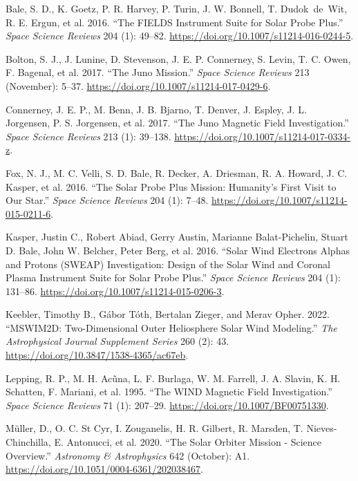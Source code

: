\documentclass[
  letterpaper,
  DIV=11,
  numbers=noendperiod,
  oneside]{scrartcl}
\newlength{\cslhangindent}
\newenvironment{CSLReferences}[2] %
 {\begin{list}{}{%
  \setlength{\itemindent}{0pt}
  \setlength{\leftmargin}{0pt}
  \setlength{\parsep}{0pt}
  \ifodd #1
   \setlength{\leftmargin}{\cslhangindent}
   \setlength{\itemindent}{-1\cslhangindent}
  \fi
  \setlength{\itemsep}{#2\baselineskip}}}
 {\end{list}}
\begin{document}
\label{refs}
\begin{CSLReferences}{1}{0}
Bale, S. D., K. Goetz, P. R. Harvey, P. Turin, J. W. Bonnell, T.
Dudok~de~Wit, R. E. Ergun, et al. 2016. {``The FIELDS Instrument Suite
for Solar Probe Plus.''} \emph{Space Science Reviews} 204 (1): 49--82.
\url{https://doi.org/10.1007/s11214-016-0244-5}.

Bolton, S. J., J. Lunine, D. Stevenson, J. E. P. Connerney, S. Levin, T.
C. Owen, F. Bagenal, et al. 2017. {``The Juno Mission.''} \emph{Space
Science Reviews} 213 (November): 5--37.
\url{https://doi.org/10.1007/s11214-017-0429-6}.

Connerney, J. E. P., M. Benn, J. B. Bjarno, T. Denver, J. Espley, J. L.
Jorgensen, P. S. Jorgensen, et al. 2017. {``The Juno Magnetic Field
Investigation.''} \emph{Space Science Reviews} 213 (1): 39--138.
\url{https://doi.org/10.1007/s11214-017-0334-z}.

Fox, N. J., M. C. Velli, S. D. Bale, R. Decker, A. Driesman, R. A.
Howard, J. C. Kasper, et al. 2016. {``The Solar Probe Plus Mission:
Humanity{'}s First Visit to Our Star.''} \emph{Space Science Reviews}
204 (1): 7--48. \url{https://doi.org/10.1007/s11214-015-0211-6}.

Kasper, Justin C., Robert Abiad, Gerry Austin, Marianne Balat-Pichelin,
Stuart D. Bale, John W. Belcher, Peter Berg, et al. 2016. {``Solar Wind
Electrons Alphas and Protons (SWEAP) Investigation: Design of the Solar
Wind and Coronal Plasma Instrument Suite for Solar Probe Plus.''}
\emph{Space Science Reviews} 204 (1): 131--86.
\url{https://doi.org/10.1007/s11214-015-0206-3}.

Keebler, Timothy B., Gábor Tóth, Bertalan Zieger, and Merav Opher. 2022.
{``MSWIM2D: Two-Dimensional Outer Heliosphere Solar Wind Modeling.''}
\emph{The Astrophysical Journal Supplement Series} 260 (2): 43.
\url{https://doi.org/10.3847/1538-4365/ac67eb}.

Lepping, R. P., M. H. Acũna, L. F. Burlaga, W. M. Farrell, J. A. Slavin,
K. H. Schatten, F. Mariani, et al. 1995. {``The WIND Magnetic Field
Investigation.''} \emph{Space Science Reviews} 71 (1): 207--29.
\url{https://doi.org/10.1007/BF00751330}.

Müller, D., O. C. St Cyr, I. Zouganelis, H. R. Gilbert, R. Marsden, T.
Nieves-Chinchilla, E. Antonucci, et al. 2020. {``The Solar Orbiter
Mission - Science Overview.''} \emph{Astronomy \& Astrophysics} 642
(October): A1. \url{https://doi.org/10.1051/0004-6361/202038467}.


\end{CSLReferences}
\end{document}
